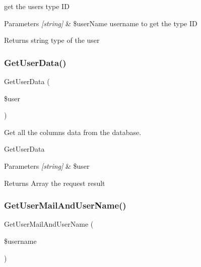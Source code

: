 get the user\textquotesingle{}s type ID 


\begin{DoxyParams}{Parameters}
{\em \mbox{[}string\mbox{]}} & \$user\+Name username to get the type ID\\
\hline
\end{DoxyParams}
\begin{DoxyReturn}{Returns}
string type of the user 
\end{DoxyReturn}
\mbox{\label{class_user_d_a_o_a2e5ac6706ceaab2a59cdc0437904dc89}} 
\subsubsection{\texorpdfstring{Get\+User\+Data()}{GetUserData()}}
{\footnotesize\ttfamily Get\+User\+Data (\begin{DoxyParamCaption}\item[{}]{\$user }\end{DoxyParamCaption})}



Get all the columns data from the database. 

Get\+User\+Data


\begin{DoxyParams}{Parameters}
{\em \mbox{[}string\mbox{]}} & \$user\\
\hline
\end{DoxyParams}
\begin{DoxyReturn}{Returns}
Array the request result 
\end{DoxyReturn}
\mbox{\label{class_user_d_a_o_a59476ad3d73dd44c3e3503af418c759c}} 
\subsubsection{\texorpdfstring{Get\+User\+Mail\+And\+User\+Name()}{GetUserMailAndUserName()}}
{\footnotesize\ttfamily Get\+User\+Mail\+And\+User\+Name (\begin{DoxyParamCaption}\item[{}]{\$username }\end{DoxyParamCaption})}



